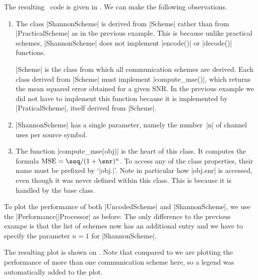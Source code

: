 The resulting \matlab\ code is given in . We can make the
following observations.
\begin{enumerate}
  \item The class |ShannonScheme| is derived from |Scheme| rather than from
    |PracticalScheme| as in the previous example. This is because unlike
    practical schemes, |ShannonScheme| does not implement |encode()| or
    |decode()| functions. 
    
    |Scheme| is the class from which all communication schemes are derived. Each
    class derived from |Scheme| must implement |compute_mse()|, which returns
    the mean squared error obtained for a given SNR. In the previous example we
    did not have to implement this function because it is implemented by
    |PraticalScheme|, itself derived from |Scheme|.
    
  \item |ShannonScheme| has a single parameter, namely the number~|n| of channel
    uses per source symbol.

  \item The function |compute_mse(obj)| is the heart of this class. It computes
    the formula $\text{MSE} = \ssq / (1 + \snr)^n$. To access any of the class
    properties, their name must be prefixed by `|obj.|'.  Note in particular how
    |obj.snr| is accessed, even though it was never defined within this class.
    This is because it is handled by the base class. 
\end{enumerate}

To plot the performance of both |UncodedScheme| and |ShannonScheme|, we use
the |Performance|\-|Processor| as before:
The only difference to the previous exampe is that the list of schemes now has
an additional entry and we have to specify the parameter $n=1$ for
|ShannonScheme|.

The resulting plot is shown on . Note that compared to
 we are plotting the performance of more than one communication
scheme here, so a legend was automatically added to the plot.

